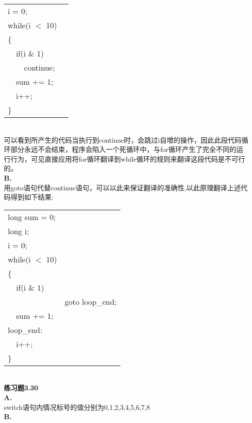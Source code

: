 \documentclass{article}
\begin{document}
\begin{CJK}{UTF8}{uyhei}
\begin{table}[ht]
\begin{tabular}{m{2em}m{2em}m{2em}l}
	\multicolumn{3}{l}{i = 0;}	\\
	\multicolumn{3}{l}{while(i $<$ 10)}	\\
	\multicolumn{3}{l}{\{}	\\
	&	\multicolumn{2}{l}{if(i \& 1)}	\\
	&	&	continue;	\\
	&	\multicolumn{2}{l}{sum += 1;}	\\
	&	\multicolumn{2}{l}{i++;}	\\
	\multicolumn{3}{l}{\}}	\\
\end{tabular}
\end{table}	\\[-2ex]
可以看到所产生的代码当执行到continue时，会跳过i自增的操作，因此此段代码循环部分永远不会结束，程序会陷入一个死循环中，与for循环产生了完全不同的运行行为，可见直接应用将for循环翻译到while循环的规则来翻译这段代码是不可行的。	\\[1ex]
\textbf{B. }	\\[1ex]
用goto语句代替continue语句，可以以此来保证翻译的准确性,以此原理翻译上述代码得到如下结果:	\\[-4ex]
\begin{table}[ht]
\begin{tabular}{m{2em}m{2em}m{2em}l}
	\multicolumn{3}{l}{long sum = 0;}	\\
	\multicolumn{3}{l}{long i;}	\\
	\multicolumn{3}{l}{i = 0;}	\\
	\multicolumn{3}{l}{while(i $<$ 10)}	\\
	\multicolumn{3}{l}{\{}	\\
	&	\multicolumn{2}{l}{if(i \& 1)}	\\
	&	&	\multicolumn{2}{l}{ goto loop\_end; }	\\
	&	\multicolumn{2}{l}{sum += 1;}	\\
	\multicolumn{3}{l}{\hspace{1.5em}loop\_end:}	\\
	&	\multicolumn{2}{l}{i++;}	\\
	\multicolumn{3}{l}{\}}	\\
\end{tabular}
\end{table}	\\[-1ex]
\textbf{练习题3.30}	\\
\textbf{A. }	\\
switch语句内情况标号的值分别为0,1,2,3,4,5,6,7,8	\\
\textbf{B. }	\\

\end{CJK}
\end{document}
